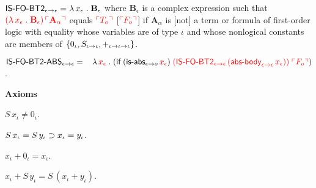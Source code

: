 \documentclass[fleqn]{llncs}
\begin{document}
\begin{biformthy}
    \item $\mbox{\sf IS-FO-BT2}_{\epsilon \rightarrow \epsilon} = \lambda\,
      x_\epsilon \mathrel. \textbf{B}_\epsilon$ {\sglsp} where
      $\textbf{B}_\epsilon$ is a complex expression such that
      $\textcolor{red}{(\lambda\, x_\epsilon \mathrel. \textbf{B}_\epsilon) \,
        \ulcorner\textbf{A}_\alpha\urcorner}$ equals $\textcolor{red}{\ulcorner T_o\urcorner}$
      [$\textcolor{red}{\ulcorner F_o\urcorner}$] if $\textbf{A}_\alpha$ is [not] a term
      or formula of first-order logic with equality whose variables
      are of type $\iota$ and whose nonlogical constants are members
      of ${\{ 0_\iota,S_{\iota \rightarrow \iota},+_{\iota \rightarrow \iota
          \rightarrow \iota} \}}$.

    \setcounter{enumi}{6}

    \iffalse

    \item $\mname{IS-FO-BT1-ABS}_{\epsilon \tarrow \epsilon} = {}\\
    \hspace*{2ex}\LambdaApp \syn{x_\epsilon} \mdot 
    (\If \; (\mname{is-abs}_{\epsilon \tarrow o} \, \syn{x_\epsilon}) \;
    \syn{(\mname{IS-FO-BT1}_{\epsilon \tarrow \epsilon} \,
    (\mname{abs-body}_{\epsilon \tarrow \epsilon} \, x_\epsilon))} \;
    \syn{\synbrack{F_o}})$.

    \fi

    \item $\mbox{\sf IS-FO-BT2-ABS}_{\epsilon \rightarrow \epsilon} = {}\\
    \hspace*{2ex}\lambda\, \textcolor{red}{x_\epsilon} \mathrel. 
    (\mbox{\sf if} \; (\mbox{\sf is-abs}_{\epsilon \rightarrow o} \, \textcolor{red}{x_\epsilon}) \;
    \textcolor{red}{(\mbox{\sf IS-FO-BT2}_{\epsilon \rightarrow \epsilon} \,
    (\mbox{\sf abs-body}_{\epsilon \rightarrow \epsilon} \, x_\epsilon))} \;
    \textcolor{red}{\ulcorner F_o\urcorner})$.

  \ee

  \item[] \textbf{Axioms}

  \be

    \item $S \, x_\iota \not= 0_\iota$.

    \item $S \, x_\iota = S \, y_\iota \supset x_\iota =
      y_\iota$.

    \item $x_\iota + 0_\iota = x_\iota$.

    \item $x_\iota + S \, y_\iota = S \, (x_\iota + y_\iota)$.


\end{biformthy}
\end{document}
